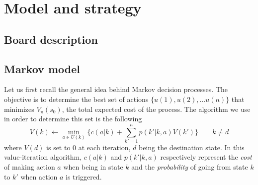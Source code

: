 \section{Model and strategy} %
\label{sec:model_and_strategy}

\subsection{Board description} %
\label{sub:board_description}

% 
% 
% 
% 

\subsection{Markov model} %
\label{sub:markov_model}
Let us first recall the general idea behind Markov decision processes.
The objective is to determine the best set of actions $\{u(1), u(2), \dots
u(n)\}$ that minimizes $V_{\pi}(s_0)$, the total expected cost of the process.
The algorithm we use in order to determine this set is the following
\[
  V(k) \leftarrow \min_{a\in U(k)} \{c(a|k) 
  + \sum_{k'=1}^n p(k'|k,a)V(k') \} \qquad k \neq d
\]
where $V(d)$ is set to 0 at each iteration, $d$ being the destination state.
In this value-iteration algorithm, $c(a|k)$ and $p(k'|k,a)$
respectively represent the \emph{cost} of making action $a$
when being in state $k$ and the \emph{probability} of going
from state $k$ to $k'$ when action $a$ is triggered.

